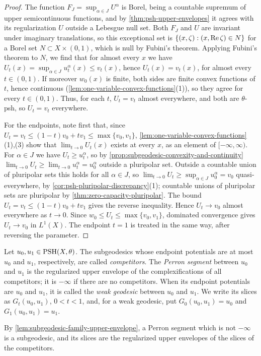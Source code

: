 \begin{proof}
The function $F_J=\sup_{\alpha\in J}U^\alpha$ is Borel, being a countable supremum of upper semicontinuous functions, and by \cref{thm:psh-upper-envelopes} it agrees with its regularization $U$ outside a Lebesgue null set. Both $F_J$ and $U$ are invariant under imaginary translations, so this exceptional set is $\{(x,\zeta):(x,\operatorname{Re}\zeta)\in N\}$ for a Borel set $N\subset X\times(0,1)$, which is null by Fubini's theorem. Applying Fubini's theorem to $N$, we find that for almost every $x$ we have $U_t(x)=\sup_{\alpha\in J}u_t^\alpha(x)\leq v_t(x)$, hence $U_t(x)=v_t(x)$, for almost every $t\in(0,1)$. If moreover $w_0(x)$ is finite, both sides are finite convex functions of $t$, hence continuous (\cref{lem:one-variable-convex-functions}(1)), so they agree for every $t\in(0,1)$. Thus, for each $t$, $U_t=v_t$ almost everywhere, and both are $\theta$-psh, so $U_t=v_t$ everywhere.

For the endpoints, note first that, since $U_t=v_t\leq(1-t)v_0+tv_1\leq\max\{v_0,v_1\}$, \cref{lem:one-variable-convex-functions}(1),(3) show that $\lim_{t\to0}U_t(x)$ exists at every $x$, as an element of $[-\infty,\infty)$. For $\alpha\in J$ we have $U_t\geq u_t^\alpha$, so by \cref{prop:subgeodesic-convexity-and-continuity} $\lim_{t\to0}U_t\geq\lim_{t\to0}u_t^\alpha=u_0^\alpha$ outside a pluripolar set. Outside a countable union of pluripolar sets this holds for all $\alpha\in J$, so $\lim_{t\to0}U_t\geq\sup_{\alpha\in J}u_0^\alpha=v_0$ quasi-everywhere, by \cref{cor:psh-pluripolar-discrepancy}(1); countable unions of pluripolar sets are pluripolar by \cref{thm:zero-capacity-pluripolar}. The bound $U_t=v_t\leq(1-t)v_0+tv_1$ gives the reverse inequality. Hence $U_t\to v_0$ almost everywhere as $t\to0$. Since $w_0\leq U_t\leq\max\{v_0,v_1\}$, dominated convergence gives $U_t\to v_0$ in $L^1(X)$. The endpoint $t=1$ is treated in the same way, after reversing the parameter.
\end{proof}

\begin{definition}\label{def:relative-perron-geodesic}
Let $u_0,u_1\in\mathrm{PSH}(X,\theta)$. The subgeodesics whose endpoint potentials are at most $u_0$ and $u_1$, respectively, are called \emph{competitors}. The \emph{Perron segment} between $u_0$ and $u_1$ is the regularized upper envelope of the complexifications of all competitors; it is $-\infty$ if there are no competitors. When its endpoint potentials are $u_0$ and $u_1$, it is called the \emph{weak geodesic} between $u_0$ and $u_1$. We write its slices as $G_t(u_0,u_1)$, $0<t<1$, and, for a weak geodesic, put $G_0(u_0,u_1)=u_0$ and $G_1(u_0,u_1)=u_1$.
\end{definition}
By \cref{lem:subgeodesic-family-upper-envelope}, a Perron segment which is not $-\infty$ is a subgeodesic, and its slices are the regularized upper envelopes of the slices of the competitors.

